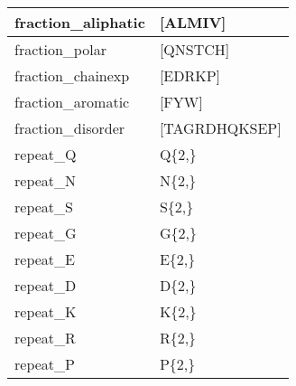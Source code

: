\begin{landscape}
\begin{longtable}{|l|l|}
\hline
fraction\_aliphatic    & {[}ALMIV]                                                                                                                  \\
\hline
fraction\_polar        & {[}QNSTCH]                                                                                                                 \\
\hline
fraction\_chainexp     & {[}EDRKP]                                                                                                                  \\
\hline
fraction\_aromatic     & {[}FYW]                                                                                                                    \\
\hline
fraction\_disorder     & {[}TAGRDHQKSEP]                                                                                                            \\
\hline
repeat\_Q              & Q\{2,\}                                                                                                                    \\
\hline
repeat\_N              & N\{2,\}                                                                                                                    \\
\hline
repeat\_S              & S\{2,\}                                                                                                                    \\
\hline
repeat\_G              & G\{2,\}                                                                                                                    \\
\hline
repeat\_E              & E\{2,\}                                                                                                                    \\
\hline
repeat\_D              & D\{2,\}                                                                                                                    \\
\hline
repeat\_K              & K\{2,\}                                                                                                                    \\
\hline
repeat\_R              & R\{2,\}                                                                                                                    \\
\hline
repeat\_P              & P\{2,\}                                                                                                                    \\

\end{longtable}
\end{landscape}

